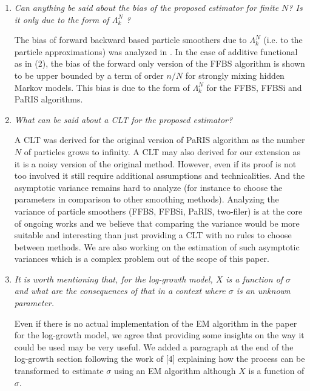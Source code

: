 \documentclass[12pt]{article}
\newcommand{\1}{\mathrm{1}}
\begin{document}
\begin{enumerate}
\item {\em Can anything be said about the bias of the proposed estimator for finite $N$? Is it
only due to the form of  $\Lambda_k^N$ ?}

\vspace{.3cm}

The bias of forward backward based particle smoothers due to $\Lambda_k^N$ (i.e. to the particle approximations) was analyzed in \cite{delmoral:doucet:singh:2010}. In the case of additive functional as in (2), the bias of the forward only version of the FFBS algorithm is shown to be upper bounded by a term of order $n/N$ for strongly mixing hidden Markov models.  This bias is due to the form of  $\Lambda_k^N$ for the FFBS, FFBSi and PaRIS algorithms.


\item {\em What can be said about a CLT for the proposed estimator?}

\vspace{.3cm}

A CLT was derived for the original version of PaRIS algorithm as the number $N$ of particles grows to infinity. A CLT may also derived for our extension as it is a noisy version of the original method. However, even if its proof is not too involved it still require additional assumptions and technicalities. And the asymptotic variance remains hard to analyze (for instance to choose the parameters in comparison to other smoothing methods). Analyzing the variance of particle smoothers (FFBS, FFBSi, PaRIS, two-filer) is at the core of ongoing works and we believe that comparing the variance would be more suitable and interesting than just providing a CLT with no rules to choose between methods. We are also working on the estimation of such asymptotic variances which is a complex problem out of the scope of this paper.

\item {\em It is worth mentioning that, for the log-growth model, $X$ is a function of $\sigma$ and what
are the consequences of that in a context where $\sigma$ is an unknown parameter.}

\vspace{.3cm}

Even if there is no actual implementation of the EM algorithm in the paper for the log-growth model, we agree that providing some insights on the way it could be used may be very useful. We added a paragraph at the end of the log-growth section following the work of [4] explaining how the process can be transformed to estimate $\sigma$ using an EM algorithm although $X$ is a function of $\sigma$.


\end{enumerate}
\end{document}
